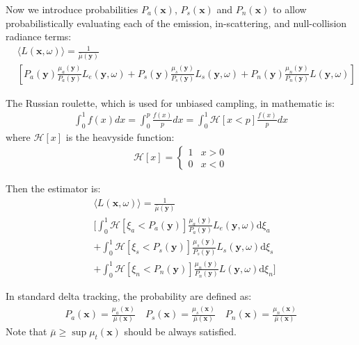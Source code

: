 \documentclass[acmtog]{acmart}
\begin{document}
Now we introduce probabilities $P_a(\mathbf x)$, $P_s(\mathbf x)$ and $P_n(\mathbf x)$ to allow probabilistically evaluating each of the emission, in-scattering, and null-collision radiance terms:
\begin{equation}
	\begin{aligned}
	&\langle L(\mathbf x, \omega)\rangle=\frac{1}{\bar\mu(\mathbf y)}\\
	&\left[P_a(\mathbf y)\frac{\mu_a(\mathbf y)}{P_a(\mathbf y)}L_e(\mathbf y, \omega)+P_s(\mathbf y)\frac{\mu_s(\mathbf y)}{P_s(\mathbf y)}L_s(\mathbf y, \omega)+P_n(\mathbf y)\frac{\mu_n(\mathbf y)}{P_n(\mathbf y)}L(\mathbf y, \omega)\right]
	\end{aligned}
\end{equation}

The Russian roulette, which is used for unbiased campling, in mathematic is:
\begin{equation}
	\begin{aligned}
	\int_0^1f(x)dx=\int_0^p\frac{f(x)}{p}dx=\int_0^1\mathcal H[x<p]\frac{f(x)}{p}dx
	\end{aligned}
\end{equation}
where $\mathcal H[x]$ is the heavyside function:
\begin{equation}
	\begin{aligned}
	\mathcal H[x] = \begin{cases}
		1& x>0\\
		0& x<0
	\end{cases}
	\end{aligned}
\end{equation}


Then the estimator is:
\begin{equation}
	\begin{aligned}
	&\langle L(\mathbf x, \omega)\rangle=\frac{1}{\bar\mu(\mathbf y)}\\
	&[\int_0^1\mathcal H[\xi_a<P_a(\mathbf y)]\frac{\mu_a(\mathbf y)}{P_a(\mathbf y)}L_e(\mathbf y, \omega)\mathrm d\xi_a\\
	&+\int_0^1\mathcal H[\xi_s<P_s(\mathbf y)]\frac{\mu_s(\mathbf y)}{P_s(\mathbf y)}L_s(\mathbf y, \omega)\mathrm d\xi_s\\
	&+\int_0^1\mathcal H[\xi_n<P_n(\mathbf y)]\frac{\mu_n(\mathbf y)}{P_n(\mathbf y)}L(\mathbf y, \omega)\mathrm d\xi_n]\label{estimator}
	\end{aligned}
\end{equation}

In standard delta tracking, the probability are defined as:
\begin{equation}
	\begin{aligned}
		P_a(\mathbf x)=\frac{\mu_a(\mathbf x)}{\bar{\mu}(\mathbf x)}\quad
		P_s(\mathbf x)=\frac{\mu_s(\mathbf x)}{\bar{\mu}(\mathbf x)}\quad
		P_n(\mathbf x)=\frac{\mu_n(\mathbf x)}{\bar{\mu}(\mathbf x)}
	\end{aligned}
\end{equation}
Note that $\bar\mu\ge\sup\mu_t(\mathbf x)$ should be always satisfied.
\end{document}
